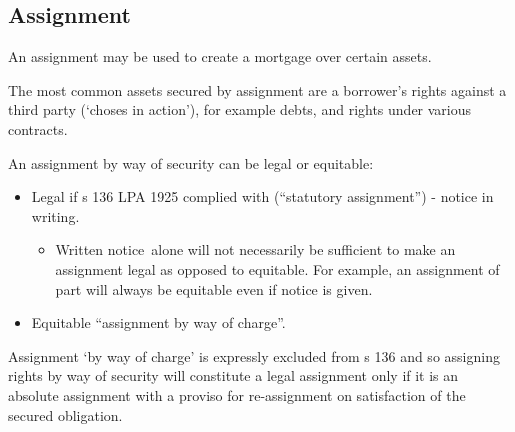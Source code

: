 \documentclass[
]{article}
\providecommand{\tightlist}{%
  \setlength{\itemsep}{0pt}\setlength{\parskip}{0pt}}
\begin{document}
\hypertarget{assignment}{%
\subsection{Assignment}\label{assignment}}

An assignment may be used to create a mortgage over certain assets.

The most common assets secured by assignment are a borrower's rights
against a third party (`choses in action'), for example debts, and
rights under various contracts.

An assignment by way of security can be legal or equitable:

\begin{itemize}
\tightlist
\item
  Legal if s 136 LPA 1925 complied with (``statutory assignment'') -
  notice in writing.

  \begin{itemize}
  \tightlist
  \item
    Written notice~alone will not necessarily be sufficient to make an
    assignment legal as opposed to equitable. For example, an assignment
    of part will always be equitable even if notice is given.
  \end{itemize}
\item
  Equitable ``assignment by way of charge''.
\end{itemize}

Assignment `by way of charge' is expressly excluded from s 136 and so
assigning rights by way of security will constitute a legal assignment
only if it is an absolute assignment with a proviso for re-assignment on
satisfaction of the secured obligation.
\end{document}
